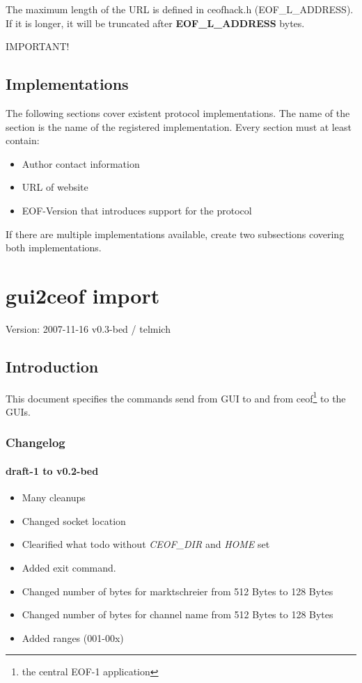 \documentclass[12pt,a4paper]{book}
\begin{document}
The maximum length of the URL is defined in ceofhack.h (EOF\_L\_ADDRESS).
If it is longer, it will be truncated after \textbf{EOF\_L\_ADDRESS} bytes.

IMPORTANT!

\section{Implementations}
The following sections cover existent protocol implementations.
The name of the section is the name of the registered implementation.
Every section must at least contain:
\begin{itemize}
\item Author contact information
\item URL of website
\item EOF-Version that introduces support for the protocol
\end{itemize}

If there are multiple implementations available, create two subsections
covering both implementations.
\chapter{gui2ceof import}

Version: 2007-11-16 v0.3-bed / telmich

\section{Introduction}
This document specifies the commands send from GUI to and from
ceof\footnote{the central EOF-1 application} to the GUIs.
\subsection{Changelog}
\subsubsection{draft-1 to v0.2-bed}
\begin{itemize}
\item Many cleanups
\item Changed socket location
\item Clearified what todo without \textit{CEOF\_DIR} and \textit{HOME} set
\item Added exit command.
\item Changed number of bytes for marktschreier from 512 Bytes to 128 Bytes
\item Changed number of bytes for channel name  from 512 Bytes to 128 Bytes
\item Added ranges (001-00x)
\end{itemize}
\end{document}
